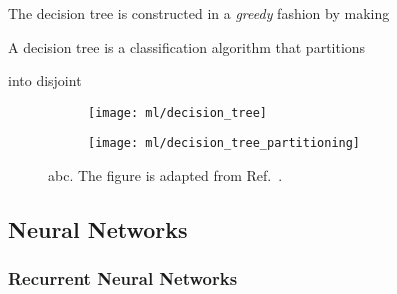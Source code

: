 The decision tree is constructed in a \emph{greedy} fashion by making







A decision tree is a classification algorithm that partitions

into disjoint

\begin{figure}[htbp]
  \centering

  \begin{subfigure}{0.46\textwidth}
    \centering
    \texttt{[image: ml/decision\_tree]}
    \caption{}
  \end{subfigure}\hfill%
  \begin{subfigure}{0.46\textwidth}
    \centering
    \texttt{[image: ml/decision\_tree\_partitioning]}
    \caption{}
  \end{subfigure}\hfill%

  \caption{abc. The figure is adapted from Ref.~\cite{hastie09}.}
  \label{fig:decision_tree}
\end{figure}





\subsection{Neural Networks}

\subsubsection{Recurrent Neural Networks}%
\label{sec:rnn}


